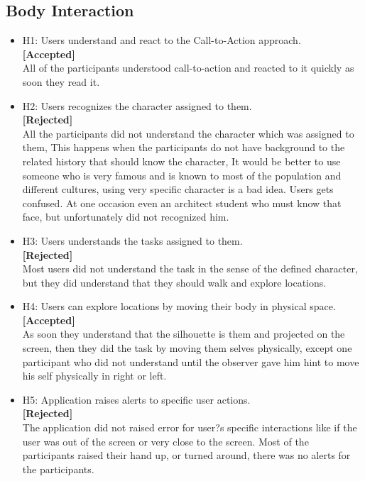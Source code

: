\subsection{Body Interaction}
\begin{itemize}
\item H1: Users understand and react to the Call-to-Action approach.\\ 
\textbf{[Accepted]}\\
All of the participants understood call-to-action and reacted to it quickly as soon they read it.

\item H2: Users recognizes the character assigned to them.\\ 
\textbf{[Rejected]}\\

All the participants did not understand the character which was assigned to them, This happens when the participants do not have background to the related history that should know the character, It would be better to use someone who is very famous and is known to most of the population and different cultures, using very specific character is a bad idea. Users gets confused. At one occasion even an architect student who must know that face, but unfortunately did not recognized him. 

\item H3: Users understands the tasks assigned to them.  \\ 
\textbf{[Rejected]}\\
Most users did not understand the task in the sense of the defined character, but they did understand that they should walk and explore locations.

\item H4: Users can explore locations by moving their body in physical space. \\ 
\textbf{[Accepted]}\\
As soon they understand that the silhouette is them and projected on the screen, then they did the task by moving them selves physically, except one participant who did not understand until the observer gave him hint to move his self physically in right or left.

\item H5: Application raises alerts to specific user actions.   \\ 
\textbf{[Rejected]}\\
The application did not raised error for user?s specific interactions like if the user was out of the screen or very close to the screen. Most of the participants raised their hand up, or turned around, there was no alerts for the participants.


\end{itemize}
